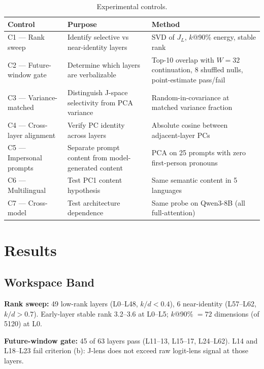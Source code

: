 \documentclass[11pt,a4paper]{article}
\begin{document}
\begin{table}[H]
\centering
\caption{Experimental controls.}
\label{tab:controls}
\small
\begin{tabular}{p{3.2cm}p{4.8cm}p{5.8cm}}
\toprule
Control & Purpose & Method \\
\midrule
C1 --- Rank sweep & Identify selective vs near-identity layers & SVD of $J_L$, $k$@90\% energy, stable rank \\
C2 --- Future-window gate & Determine which layers are verbalizable & Top-10 overlap with $W = 32$ continuation, 8 shuffled nulls, point-estimate pass/fail \\
C3 --- Variance-matched & Distinguish J-space selectivity from PCA variance & Random-in-covariance at matched variance fraction \\
C4 --- Cross-layer alignment & Verify PC identity across layers & Absolute cosine between adjacent-layer PCs \\
C5 --- Impersonal prompts & Separate prompt content from model-generated content & PCA on 25 prompts with zero first-person pronouns \\
C6 --- Multilingual & Test PC1 content hypothesis & Same semantic content in 5 languages \\
C7 --- Cross-model & Test architecture dependence & Same probe on Qwen3-8B (all full-attention) \\
\bottomrule
\end{tabular}
\end{table}

\section{Results}

\subsection{Workspace Band}

\textbf{Rank sweep:} 49 low-rank layers (L0--L48, $k/d < 0.4$), 6 near-identity (L57--L62, $k/d > 0.7$). Early-layer stable rank 3.2--3.6 at L0--L5; $k$@90\% $= 72$ dimensions (of 5120) at L0.

\textbf{Future-window gate:} 45 of 63 layers pass (L11--13, L15--17, L24--L62). L14 and L18--L23 fail criterion (b): J-lens does not exceed raw logit-lens signal at those layers.
\end{document}
